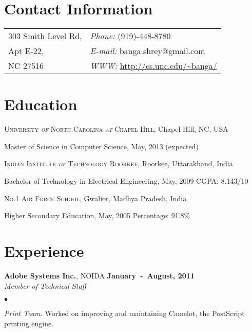 \documentclass[margin,line]{res}
\newenvironment{list1}{
  \begin{list}{\ding{113}}{%
      \setlength{\itemsep}{0in}
      \setlength{\parsep}{0in} \setlength{\parskip}{0in}
      \setlength{\topsep}{0in} \setlength{\partopsep}{0in} 
      \setlength{\leftmargin}{0.17in}}}{\end{list}}
\newenvironment{list2}{
  \begin{list}{$\bullet$}{%
      \setlength{\itemsep}{0in}
      \setlength{\parsep}{0in} \setlength{\parskip}{0in}
      \setlength{\topsep}{0in} \setlength{\partopsep}{0in} 
      \setlength{\leftmargin}{0.2in}}}{\end{list}}
\begin{document}

\begin{resume}
\section{\sc Contact Information}
\vspace{.05in}
\begin{tabular}{@{}p{2in}p{4in}}
303 Smith Level Rd, & {\it Phone:}  (919)-448-8780 \\            
Apt E-22, & {\it E-mail:}  banga.shrey@gmail.com \\
NC 27516& {\it WWW:} \url{http://cs.unc.edu/~banga/} \\
\end{tabular}

\section{\sc Education}
\textsc{University \textit{of} North Carolina \textit{at} Chapel Hill}, Chapel Hill, NC, USA\\
\vspace*{-.1in}
\begin{list1}
\item[] Master of Science in Computer Science, May, 2013 (expected)
\end{list1}

\textsc{Indian Institute \textit{of} Technology Roorkee}, Roorkee, Uttarakhand, India\\
\vspace*{-.1in}
\begin{list1}
\item[] Bachelor of Technology in Electrical Engineering, May, 2009 \hfill {CGPA: 8.143/10}
\end{list1}

\textsc{No.1 Air Force School}, Gwalior, Madhya Pradesh, India\\
\vspace*{-.1in}
\begin{list1}
\item[] Higher Secondary Education,  May, 2005 \hfill {Percentage: 91.8\%}
\end{list1}

\section{\sc Experience}
{\bf Adobe Systems Inc.}, NOIDA \hfill {\bf January~-~August, 2011}\\
{\em Member of Technical Staff}\par
\begin{list2}
\item {\em Print Team.} Worked on improving and maintaining Camelot, the PostScript printing engine.
\end{list2}


\end{resume}
\end{document}
